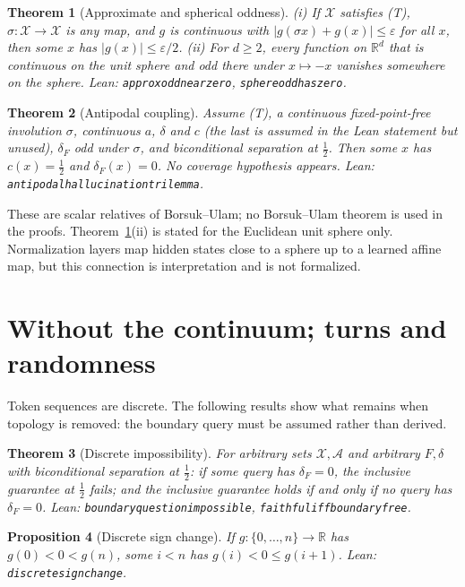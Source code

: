 \documentclass[10pt]{article}
\newtheorem{theorem}{Theorem}
\newtheorem{proposition}[theorem]{Proposition}
\theoremstyle{definition}
\theoremstyle{remark}
\newcommand{\X}{\mathcal{X}}
\newcommand{\A}{\mathcal{A}}
\newcommand{\R}{\mathbb{R}}
\newcommand{\conf}{c}
\newcommand{\dF}{\delta_{\!F}}
\newcommand{\leanid}[1]{{\def\_{\textunderscore\allowbreak}\texttt{#1}}}
\begin{document}
\begin{theorem}[Approximate and spherical oddness]
\label{thm:approx-odd}
(i) If $\X$ satisfies (T), $\sigma:\X\to\X$ is any map, and $g$ is
continuous with $|g(\sigma x)+g(x)|\le\varepsilon$ for \emph{all} $x$,
then some $x$ has $|g(x)|\le\varepsilon/2$.
(ii) For $d\ge2$, every function on $\R^d$ that is continuous on the unit
sphere and odd there under $x\mapsto-x$ vanishes somewhere on the
sphere. Lean: \leanid{approx\_odd\_near\_zero},
\leanid{sphere\_odd\_has\_zero}.
\end{theorem}

\begin{theorem}[Antipodal coupling]
\label{thm:antipodal}
Assume (T), a continuous fixed-point-free involution $\sigma$, continuous
$a$, $\delta$ and $\conf$ (the last is assumed in the Lean statement but
unused), $\dF$ odd under $\sigma$, and biconditional separation
at $\tfrac12$. Then some $x$ has $\conf(x)=\tfrac12$ and $\dF(x)=0$. No
coverage hypothesis appears. Lean:
\leanid{antipodal\_hallucination\_trilemma}.
\end{theorem}

These are scalar relatives of Borsuk--Ulam; no Borsuk--Ulam theorem is
used in the proofs. Theorem~\ref{thm:approx-odd}(ii) is stated for the
Euclidean unit sphere only. Normalization layers map hidden states close
to a sphere up to a learned affine map, but this connection is
interpretation and is not formalized.

\section{Without the continuum; turns and randomness}
\label{sec:discrete}

Token sequences are discrete. The following results show what remains
when topology is removed: the boundary query must be assumed rather than
derived.

\begin{theorem}[Discrete impossibility]
\label{thm:discrete}
For arbitrary sets $\X,\A$ and arbitrary $F,\delta$ with biconditional
separation at $\tfrac12$: if some query has $\dF=0$, the inclusive
guarantee at $\tfrac12$ fails; and the inclusive guarantee holds if and
only if no query has $\dF=0$. Lean:
\leanid{boundary\_question\_impossible},
\leanid{faithful\_iff\_boundary\_free}.
\end{theorem}

\begin{proposition}[Discrete sign change]
\label{prop:discrete-ivt}
If $g:\{0,\dots,n\}\to\R$ has $g(0)<0<g(n)$, some $i<n$ has
$g(i)<0\le g(i+1)$. Lean: \leanid{discrete\_sign\_change}.
\end{proposition}
\end{document}
